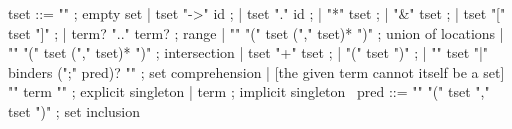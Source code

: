 \begin{syntax}
  tset ::= "\empty" ; empty set
       | tset "->" id ;
       | tset "." id ;
       | "*" tset ;
       | "&" tset ;
       | tset "[" tset "]" ;
       | term? ".." term? ; range
       | "\union" "(" tset ("," tset)* ")" ; union of locations
       | "\inter" "(" tset ("," tset)* ")" ; intersection
       | tset "+" tset ;
       | "(" tset ")" ;
       | "{" tset "|" binders (";" pred)? "}" ; set comprehension
       | {[the given term cannot itself be a set] "{" term "}" } ; explicit singleton
       | term ; implicit singleton
       \
  pred ::= "\subset" "(" tset "," tset ")" ; set inclusion
\end{syntax}

